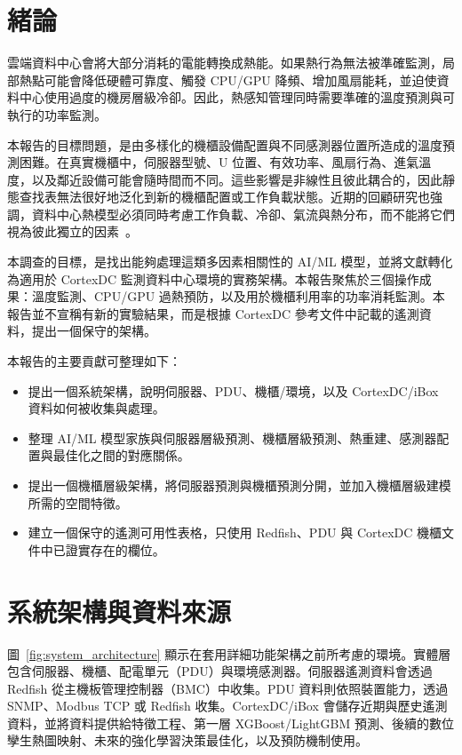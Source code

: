 \documentclass[12pt,a4paper]{article}
\begin{document}
\newpage
{}

\section{緒論}

雲端資料中心會將大部分消耗的電能轉換成熱能。如果熱行為無法被準確監測，局部熱點可能會降低硬體可靠度、觸發 CPU/GPU 降頻、增加風扇能耗，並迫使資料中心使用過度的機房層級冷卻。因此，熱感知管理同時需要準確的溫度預測與可執行的功率監測。

本報告的目標問題，是由多樣化的機櫃設備配置與不同感測器位置所造成的溫度預測困難。在真實機櫃中，伺服器型號、U 位置、有效功率、風扇行為、進氣溫度，以及鄰近設備可能會隨時間而不同。這些影響是非線性且彼此耦合的，因此靜態查找表無法很好地泛化到新的機櫃配置或工作負載狀態。近期的回顧研究也強調，資料中心熱模型必須同時考慮工作負載、冷卻、氣流與熱分布，而不能將它們視為彼此獨立的因素~\cite{lin_review_2024}。

本調查的目標，是找出能夠處理這類多因素相關性的 AI/ML 模型，並將文獻轉化為適用於 CortexDC 監測資料中心環境的實務架構。本報告聚焦於三個操作成果：溫度監測、CPU/GPU 過熱預防，以及用於機櫃利用率的功率消耗監測。本報告並不宣稱有新的實驗結果，而是根據 CortexDC 參考文件中記載的遙測資料，提出一個保守的架構。

本報告的主要貢獻可整理如下：
\begin{itemize}
\item 提出一個系統架構，說明伺服器、PDU、機櫃/環境，以及 CortexDC/iBox 資料如何被收集與處理。
\item 整理 AI/ML 模型家族與伺服器層級預測、機櫃層級預測、熱重建、感測器配置與最佳化之間的對應關係。
\item 提出一個機櫃層級架構，將伺服器預測與機櫃預測分開，並加入機櫃層級建模所需的空間特徵。
\item 建立一個保守的遙測可用性表格，只使用 Redfish、PDU 與 CortexDC 機櫃文件中已證實存在的欄位。
\end{itemize}

\section{系統架構與資料來源}

圖~\ref{fig:system_architecture} 顯示在套用詳細功能架構之前所考慮的環境。實體層包含伺服器、機櫃、配電單元（PDU）與環境感測器。伺服器遙測資料會透過 Redfish 從主機板管理控制器（BMC）中收集。PDU 資料則依照裝置能力，透過 SNMP、Modbus TCP 或 Redfish 收集。CortexDC/iBox 會儲存近期與歷史遙測資料，並將資料提供給特徵工程、第一層 XGBoost/LightGBM 預測、後續的數位孿生熱圖映射、未來的強化學習決策最佳化，以及預防機制使用。
\end{document}
